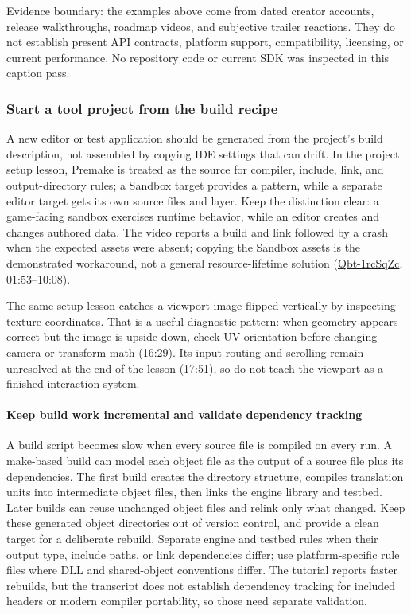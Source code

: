 Evidence boundary: the examples above come from dated creator accounts, release walkthroughs, roadmap videos, and subjective trailer reactions. They do not establish present API contracts, platform support, compatibility, licensing, or current performance. No repository code or current SDK was inspected in this caption pass.

\subsubsection{Start a tool project from the build recipe}\label{start-a-tool-project-from-the-build-recipe}

A new editor or test application should be generated from the project's build description, not assembled by copying IDE settings that can drift. In the project setup lesson, Premake is treated as the source for compiler, include, link, and output-directory rules; a Sandbox target provides a pattern, while a separate editor target gets its own source files and layer. Keep the distinction clear: a game-facing sandbox exercises runtime behavior, while an editor creates and changes authored data. The video reports a build and link followed by a crash when the expected assets were absent; copying the Sandbox assets is the demonstrated workaround, not a general resource-lifetime solution (\href{https://www.youtube.com/watch?v=Qbt-1rcSqZc}{Qbt-1rcSqZc}, 01:53--10:08).

The same setup lesson catches a viewport image flipped vertically by inspecting texture coordinates. That is a useful diagnostic pattern: when geometry appears correct but the image is upside down, check UV orientation before changing camera or transform math (16:29). Its input routing and scrolling remain unresolved at the end of the lesson (17:51), so do not teach the viewport as a finished interaction system.

\paragraph{Keep build work incremental and validate dependency tracking}\label{keep-build-work-incremental-and-validate-dependency-tracking}

A build script becomes slow when every source file is compiled on every run. A make-based build can model each object file as the output of a source file plus its dependencies. The first build creates the directory structure, compiles translation units into intermediate object files, then links the engine library and testbed. Later builds can reuse unchanged object files and relink only what changed. Keep these generated object directories out of version control, and provide a clean target for a deliberate rebuild. Separate engine and testbed rules when their output type, include paths, or link dependencies differ; use platform-specific rule files where DLL and shared-object conventions differ. The tutorial reports faster rebuilds, but the transcript does not establish dependency tracking for included headers or modern compiler portability, so those need separate validation.

